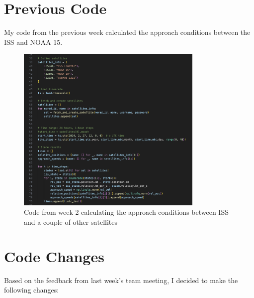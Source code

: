 \documentclass[12pt]{report}
\begin{document}
\chapter*{Previous Code}
My code from the previous week calculated the approach conditions between the ISS and NOAA 15.
\begin{figure}[H]
    \centering
    \includegraphics[width=0.8\textwidth]{figure_week_2_code.png}
    \caption{Code from week 2 calculating the approach conditions between ISS and a couple of other satellites}
    \label{fig:code}
\end{figure}

\chapter*{Code Changes}

Based on the feedback from last week’s team meeting, I decided to make the following changes:
\end{document}
